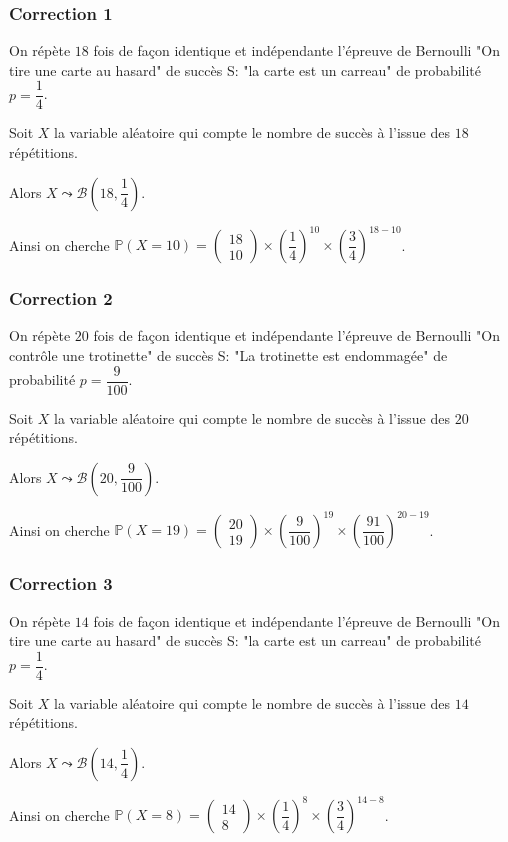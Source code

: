 \documentclass[15pt, mathserif]{beamer}
\begin{document}
\begin{frame}
\vspace{-10mm}
	\frametitle{Correction 1}
On répète $18$ fois de façon identique et indépendante l'épreuve de Bernoulli "On tire une carte au hasard" de succès S: "la carte est un carreau"  de probabilité $p =\dfrac{1}{4}$.

Soit $X$ la variable aléatoire qui compte le nombre de succès à l'issue des $18$ répétitions.

 Alors $X \leadsto \mathcal{B}\left(18,\dfrac{1}{4}\right)$.

Ainsi on cherche $\mathbb{P}(X = 10) = \begin{pmatrix}18\\10\end{pmatrix}\times\left(\dfrac{1}{4}\right)^{10}\times\left(\dfrac{3}{4}\right)^{18-10}$.\end{frame}


\begin{frame}
\vspace{-10mm}
	\frametitle{Correction 2}
On répète $20$ fois de façon identique et indépendante l'épreuve de Bernoulli "On contrôle une trotinette" de succès S: "La trotinette est endommagée" de probabilité $p =\dfrac{9}{100}$.

Soit $X$ la variable aléatoire qui compte le nombre de succès à l'issue des $20$ répétitions.

 Alors $X \leadsto \mathcal{B}\left(20,\dfrac{9}{100}\right)$.

Ainsi on cherche $\mathbb{P}(X = 19) = \begin{pmatrix}20\\19\end{pmatrix}\times\left(\dfrac{9}{100}\right)^{19}\times\left(\dfrac{91}{100}\right)^{20-19}$.\end{frame}


\begin{frame}
\vspace{-10mm}
	\frametitle{Correction 3}
On répète $14$ fois de façon identique et indépendante l'épreuve de Bernoulli "On tire une carte au hasard" de succès S: "la carte est un carreau"  de probabilité $p =\dfrac{1}{4}$.

Soit $X$ la variable aléatoire qui compte le nombre de succès à l'issue des $14$ répétitions.

 Alors $X \leadsto \mathcal{B}\left(14,\dfrac{1}{4}\right)$.

Ainsi on cherche $\mathbb{P}(X = 8) = \begin{pmatrix}14\\8\end{pmatrix}\times\left(\dfrac{1}{4}\right)^{8}\times\left(\dfrac{3}{4}\right)^{14-8}$.\end{frame}
\end{document}

